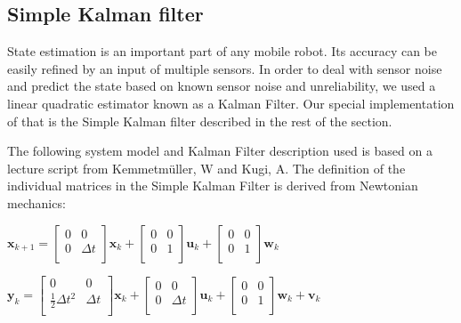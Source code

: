 \documentclass[class=article, crop=false]{standalone}
\begin{document}
\subsection{Simple Kalman filter}\label{subsec:simple-kalman}
State estimation is an important part of any mobile robot. Its accuracy can be easily refined by an input of multiple sensors. In order to deal with sensor noise and predict the state based on known sensor noise and unreliability, we used a linear quadratic estimator known as a Kalman Filter. Our special implementation of that is the Simple Kalman filter described in the rest of the section.

The following system model and Kalman Filter description used is based on a lecture script from Kemmetm{\"u}ller, W and Kugi, A\cite{regelungssysteme1}. The definition of the individual matrices in the Simple Kalman Filter is derived from Newtonian mechanics:

\vspace{0.5cm}
\hspace{2cm}
$ \textbf{x}_{k+1} =
\begin{bmatrix}
  0 & 0 \\
  0 & \Delta t \\
\end{bmatrix}
\textbf{x}_k +
\begin{bmatrix}
  0 & 0 \\
  0 & 1 \\
\end{bmatrix}
\textbf{u}_k +
\begin{bmatrix}
  0 & 0 \\
  0 & 1 \\
\end{bmatrix}
\textbf{w}_k $

\vspace{0.5cm}
\hspace{2cm}
$ \textbf{y}_k =
\begin{bmatrix}
  0 & 0 \\
  \frac{1}{2} \Delta t^2 & \Delta t \\
\end{bmatrix}
\textbf{x}_k +
\begin{bmatrix}
    0 & 0 \\
    0 & \Delta t \\
\end{bmatrix}
\textbf{u}_k +
\begin{bmatrix}
    0 & 0 \\
    0 & 1 \\
\end{bmatrix}
\textbf{w}_k +
\textbf{v}_k $
\label{eqn:system}
\end{document}
